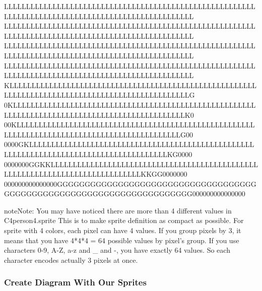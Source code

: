 \documentclass[letterpaper,10pt,english]{sphinxmanual}
\begin{document}
\begin{sphinxVerbatim}[commandchars=\\\{\},numbers=left,firstnumber=1,stepnumber=1]
LLLLLLLLLLLLLLLLLLLLLLLLLLLLLLLLLLLLLLLLLLLLLLLLLLLLLLLLLLLLLLLLLLLLLLLLLLLLLLLLLLLLLLLLLLLLLLLLLLLL
LLLLLLLLLLLLLLLLLLLLLLLLLLLLLLLLLLLLLLLLLLLLLLLLLLLLLLLLLLLLLLLLLLLLLLLLLLLLLLLLLLLLLLLLLLLLLLLLLLLL
LLLLLLLLLLLLLLLLLLLLLLLLLLLLLLLLLLLLLLLLLLLLLLLLLLLLLLLLLLLLLLLLLLLLLLLLLLLLLLLLLLLLLLLLLLLLLLLLLLLL
LLLLLLLLLLLLLLLLLLLLLLLLLLLLLLLLLLLLLLLLLLLLLLLLLLLLLLLLLLLLLLLLLLLLLLLLLLLLLLLLLLLLLLLLLLLLLLLLLLLL
KLLLLLLLLLLLLLLLLLLLLLLLLLLLLLLLLLLLLLLLLLLLLLLLLLLLLLLLLLLLLLLLLLLLLLLLLLLLLLLLLLLLLLLLLLLLLLLLLLLG
0KLLLLLLLLLLLLLLLLLLLLLLLLLLLLLLLLLLLLLLLLLLLLLLLLLLLLLLLLLLLLLLLLLLLLLLLLLLLLLLLLLLLLLLLLLLLLLLLLK0
00KLLLLLLLLLLLLLLLLLLLLLLLLLLLLLLLLLLLLLLLLLLLLLLLLLLLLLLLLLLLLLLLLLLLLLLLLLLLLLLLLLLLLLLLLLLLLLLG00
0000GKLLLLLLLLLLLLLLLLLLLLLLLLLLLLLLLLLLLLLLLLLLLLLLLLLLLLLLLLLLLLLLLLLLLLLLLLLLLLLLLLLLLLLLLLKG0000
0000000GGKKLLLLLLLLLLLLLLLLLLLLLLLLLLLLLLLLLLLLLLLLLLLLLLLLLLLLLLLLLLLLLLLLLLLLLLLLLLLLLLKKGG0000000
000000000000000GGGGGGGGGGGGGGGGGGGGGGGGGGGGGGGGGGGGGGGGGGGGGGGGGGGGGGGGGGGGGGGGGGGGGG000000000000000
\PYGZcb{}

\end{sphinxVerbatim}

\begin{sphinxadmonition}{note}{Note:}
You may have noticed there are more than 4 different values in C4person4.sprite
This is to make sprite definition as compact as possible. For sprite with 4 colors, each pixel can have 4 values.
If you group pixels by 3, it means that you have 4*4*4 = 64 possible values by pixel’s group.
If you use characters 0-9, A-Z, a-z and \_ and -, you have exactly 64 values.
So each character encodes actually 3 pixels at once.
\end{sphinxadmonition}


\subsubsection{Create Diagram With Our Sprites}
\label{\detokenize{PlantUMLSpriteLibraries/plantuml_sprites:create-diagram-with-our-sprites}}\label{\detokenize{PlantUMLSpriteLibraries/plantuml_sprites:scalebigsmall-label}}
\begin{figure}[htbp]
\centering

\end{figure}
\end{document}
